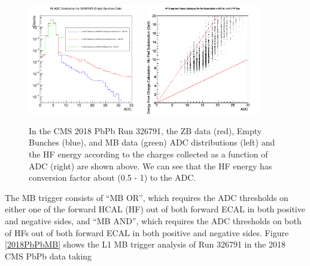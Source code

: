 \begin{figure}[hbtp]
\begin{center}
\includegraphics[width=0.45\textwidth]{Figures/Chapter3/AllADC.png}
\includegraphics[width=0.45\textwidth]{Figures/Chapter3/HFvsADC.png}
\caption{In the CMS 2018 PbPb Run 326791, the ZB data (red), Empty Bunches (blue), and MB data (green) ADC distributions (left) and the HF energy according to the charges collected as a function of ADC (right) are shown above. We can see that the HF energy has conversion factor about (0.5 - 1) to the ADC.}
\label{HFADC}
\end{center}
\end{figure} 

The MB trigger consists of ``MB OR'', which requires the ADC thresholds on either one of the forward HCAL (HF) out of both forward ECAL in both positive and negative sides, and ``MB AND'',  which requires the ADC thresholds on both of HFs out of both forward ECAL in both positive and negative sides. Figure \ref{2018PbPbMB} shows the L1 MB trigger analysis of Run 326791 in the 2018 CMS PbPb data taking 

